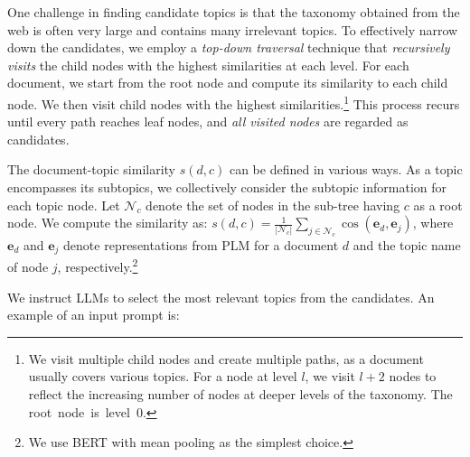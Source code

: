 One challenge in finding candidate topics is that the taxonomy obtained from the web is often very large and contains many irrelevant topics.%
To effectively narrow down the candidates, we employ a \textit{top-down traversal} technique that \textit{recursively visits} the child nodes with the highest similarities at each level.
For each document, we start from the root node and compute its similarity to each child node.
We then visit child nodes with the highest similarities.\footnote{We visit multiple child nodes and create multiple paths, as a document usually covers various topics. For a node at level $l$, we visit $l+2$ nodes to reflect the increasing number of nodes at deeper levels of the taxonomy. The root~node~is~level~$0$.}
This process recurs until every path reaches leaf nodes, and \textit{all visited nodes} are regarded as candidates.


The document-topic similarity ${s}(d, c)$ can be defined in various ways.
As a topic encompasses its subtopics, we collectively consider the subtopic information for each topic node.
Let $\mathcal{N}_c$ denote the set of nodes in the sub-tree having $c$ as a root node.
We compute the similarity as: ${s}(d, c) = \frac{1}{|\mathcal{N}_c|}\sum_{j \in \mathcal{N}_c} \operatorname{cos}(\mathbf{e}_{d}, \mathbf{e}_{j})$, 
where $\mathbf{e}_d$ and $\mathbf{e}_j$ denote representations from PLM for a document $d$ and the topic name of node $j$, respectively.\footnote{We use BERT with mean pooling as the simplest choice.}


We instruct LLMs to select the most relevant topics from the candidates.
An example of an input prompt is:
\begin{table}[h]
\small
    \centering
    \vspace{-0.3cm}
\end{table}

